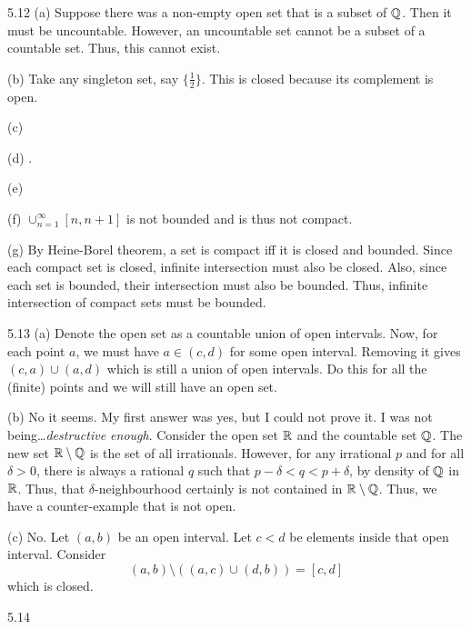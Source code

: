 5.12 (a) Suppose there was a non-empty open set that is a subset of $\mathbb{Q}$. Then it must be uncountable. However,
an uncountable set cannot be a subset of a countable set. Thus, this cannot exist.

(b) Take any singleton set, say $\{\frac{1}{2}\}$. This is closed because its complement is open.

(c) 

(d) \Z.

(e) 

(f) $\cup_{n=1}^{\infty} [n,n+1]$ is not bounded and is thus not compact.

(g) By Heine-Borel theorem, a set is compact iff it is closed and bounded. Since each compact set is closed, infinite intersection must also be closed. Also, since each set is bounded, their intersection 
must also be bounded. Thus, infinite intersection of compact sets must be bounded.

5.13 (a) Denote the open set as a countable union of open intervals. Now, for each point $a$, we must have $a \in (c,d)$
for some open interval. Removing it gives $(c,a) \cup (a,d)$ which is still a union of open intervals. Do this for all the (finite)
points and we will still have an open set.

(b) No it seems. My first answer was yes, but I could not prove it. I was not being\ldots \emph{destructive enough}. Consider the open set $\mathbb{R}$ and the countable set $\mathbb{Q}$.
The new set $\mathbb{R} \setminus \mathbb{Q}$ is the set of all irrationals. However, for any irrational $p$ and for all $\delta > 0$, there is always
a rational $q$ such that $p-\delta < q < p + \delta$, by density of $\mathbb{Q}$ in $\mathbb{R}$. Thus, that $\delta$-neighbourhood certainly is not contained in $\mathbb{R} \setminus \mathbb{Q}$.
Thus, we have a counter-example that is not open.

(c) No. Let $(a,b)$ be an open interval. Let $c < d$ be elements inside that open interval. Consider 
\[(a,b) \setminus ((a,c) \cup (d,b)) = [c,d]\]
which is closed.

5.14